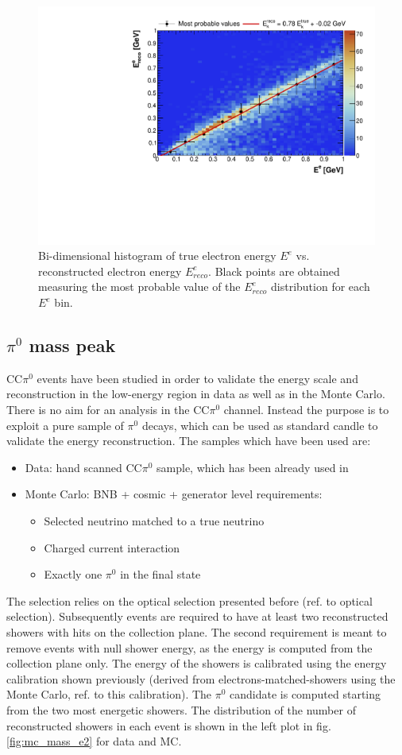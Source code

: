 \begin{figure}[!htbp]
\centering
\includegraphics[width=0.65\columnwidth]{figures/ecalib.pdf}
\caption{Bi-dimensional histogram of true electron energy $E^{e}$ vs. reconstructed electron energy $E_{reco}^{e}$. Black points are obtained measuring the most probable value of the $E_{reco}^{e}$ distribution for each $E^{e}$ bin.}
\label{fig:ecalib}
\end{figure}



\subsection{\texorpdfstring{$\pi^0$}{pi0} mass peak}

CC$\pi^0$ events have been studied in order to validate the energy scale and reconstruction in the low-energy region in data as well as in the Monte Carlo. There is no aim for an analysis in the CC$\pi^0$ channel. Instead the purpose is to exploit a pure sample of $\pi^0$ decays, which can be used as standard candle to validate the energy reconstruction.
The samples which have been used are:
\begin{itemize}
  \item Data: hand scanned CC$\pi^0$ sample, which has been already used in \cite{caratelli}
  \item Monte Carlo: BNB + cosmic + generator level requirements:
  	\begin{itemize}
  		\item Selected neutrino matched to a true neutrino
		\item Charged current interaction
		\item Exactly one $\pi^0$ in the final state
  	\end{itemize}
\end{itemize}
The selection relies on the optical selection presented before (ref. to optical selection). Subsequently events are required to have at least two reconstructed showers with hits on the collection plane. The second requirement is meant to remove events with null shower energy, as the energy is computed from the collection plane only. The energy of the showers is calibrated using the energy calibration shown previously (derived from electrons-matched-showers using the Monte Carlo, ref. to this calibration).
The $\pi^0$ candidate is computed starting from the two most energetic showers. The distribution of the number of reconstructed showers in each event is shown in the left plot in fig. \ref{fig:mc_mass_e2} for data and MC.

